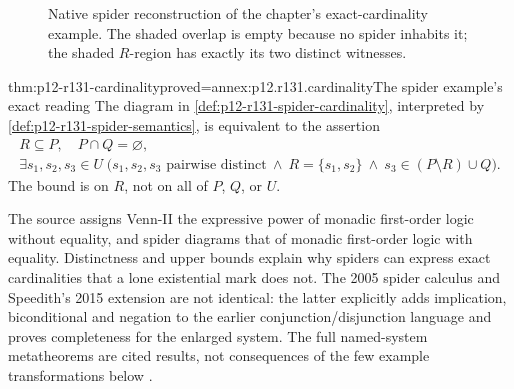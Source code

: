 \begin{figure}[htbp]
\centering
{}
\caption{Native spider reconstruction of the chapter's exact-cardinality
example. The shaded overlap is empty because no spider inhabits it;
the shaded \(R\)-region has exactly its two distinct witnesses.}
\label{fig:p12-r131-spider-cardinality}
\end{figure}

\begin{hbtheorem}{thm:p12-r131-cardinality}{proved=annex:p12.r131.cardinality}{The spider example's exact reading}
The diagram in \cref{def:p12-r131-spider-cardinality}, interpreted by
\cref{def:p12-r131-spider-semantics}, is equivalent to the assertion
\[
\begin{gathered}
 R\subseteq P,\quad P\cap Q=\varnothing,\\
 \exists s_1,s_2,s_3\in U\;
 \bigl(s_1,s_2,s_3\text{ pairwise distinct}\ \land\
 R=\{s_1,s_2\}\ \land\ s_3\in(P\setminus R)\cup Q\bigr).
\end{gathered}
\]
The bound is on \(R\), not on all of \(P\), \(Q\), or \(U\).
\end{hbtheorem}

The source assigns Venn-II the expressive power of monadic first-order
logic without equality, and spider diagrams that of monadic first-order
logic with equality. Distinctness and upper bounds explain why spiders
can express exact cardinalities that a lone existential mark does not.
The 2005 spider calculus and Speedith's 2015 extension are not identical:
the latter explicitly adds implication, biconditional and negation to the
earlier conjunction/disjunction language and proves completeness for the
enlarged system. The full named-system metatheorems are cited results,
not consequences of the few example transformations below
\cite[pp.~718,722]{Jamnik2021LogicalDiagrams}
\cite[sec.~3.4, appendices~2--3]{UrbasJamnikStapleton2015Speedith}.

